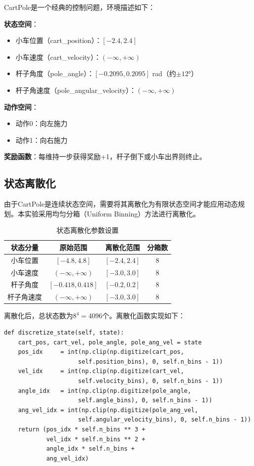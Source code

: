 \documentclass[12pt,a4paper]{article}
\begin{document}
CartPole是一个经典的控制问题，环境描述如下：

\textbf{状态空间}：
\begin{itemize}[itemsep=0pt]
    \item 小车位置（cart\_position）：$[-2.4, 2.4]$
    \item 小车速度（cart\_velocity）：$(-\infty, +\infty)$
    \item 杆子角度（pole\_angle）：$[-0.2095, 0.2095]$ rad（约$\pm 12°$）
    \item 杆子角速度（pole\_angular\_velocity）：$(-\infty, +\infty)$
\end{itemize}

\textbf{动作空间}：
\begin{itemize}[itemsep=0pt]
    \item 动作0：向左施力
    \item 动作1：向右施力
\end{itemize}

\textbf{奖励函数}：每维持一步获得奖励+1，杆子倒下或小车出界则终止。

\subsection{状态离散化}

由于CartPole是连续状态空间，需要将其离散化为有限状态空间才能应用动态规划。本实验采用均匀分箱（Uniform Binning）方法进行离散化。

\begin{table}[H]
\centering
\caption{状态离散化参数设置}
\label{tab:discretization}
\begin{tabular}{cccc}
\toprule
\textbf{状态分量} & \textbf{原始范围} & \textbf{离散化范围} & \textbf{分箱数} \\
\midrule
小车位置 & $[-4.8, 4.8]$ & $[-2.4, 2.4]$ & 8 \\
小车速度 & $(-\infty, +\infty)$ & $[-3.0, 3.0]$ & 8 \\
杆子角度 & $[-0.418, 0.418]$ & $[-0.2, 0.2]$ & 8 \\
杆子角速度 & $(-\infty, +\infty)$ & $[-3.0, 3.0]$ & 8 \\
\bottomrule
\end{tabular}
\end{table}

离散化后，总状态数为$8^4 = 4096$个。离散化函数实现如下：

\begin{lstlisting}[caption={状态离散化函数}]
def discretize_state(self, state):
    cart_pos, cart_vel, pole_angle, pole_ang_vel = state
    pos_idx     = int(np.clip(np.digitize(cart_pos, 
                     self.position_bins), 0, self.n_bins - 1))
    vel_idx     = int(np.clip(np.digitize(cart_vel, 
                     self.velocity_bins), 0, self.n_bins - 1))
    angle_idx   = int(np.clip(np.digitize(pole_angle, 
                     self.angle_bins), 0, self.n_bins - 1))
    ang_vel_idx = int(np.clip(np.digitize(pole_ang_vel, 
                     self.angular_velocity_bins), 0, self.n_bins - 1))
    return (pos_idx * self.n_bins ** 3 +
            vel_idx * self.n_bins ** 2 +
            angle_idx * self.n_bins +
            ang_vel_idx)
\end{lstlisting}
\end{document}

